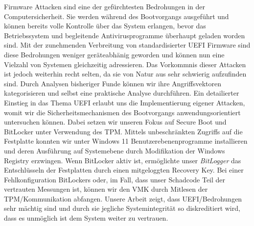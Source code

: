 Firmware Attacken sind eine der gef\"urchtesten Bedrohungen in der Computersicherheit.
Sie werden w\"ahrend des Bootvorgangs ausgef\"uhrt und k\"onnen bereits volle Kontrolle \"uber das System erlangen, bevor das Betriebssystem und begleitende Antivirusprogramme \"uberhaupt geladen worden sind.
Mit der zunehmenden Verbreitung von standardisierter \acf{UEFI} Firmware sind diese Bedrohungen weniger ger\"ateabh\"anig geworden und k\"onnen nun eine Vielzahl von Systemen gleichzeitig adressieren.
Das Vorkommnis dieser Attacken ist jedoch weiterhin recht selten, da sie von Natur aus sehr schwierig aufzufinden sind.
Durch Analysen bisheriger Funde k\"onnen wir ihre Angriffsvektoren kategorisieren und selbst eine praktische Analyse durchf\"uhren.
Ein detailierter Einstieg in das Thema \ac{UEFI} erlaubt uns die Implementierung eigener Attacken, womit wir die Sicherheitsmechanismen des Bootvorgangs anwendungsorientiert untersuchen k\"onnen.
Dabei setzen wir unseren Fokus auf Secure Boot und BitLocker unter Verwendung des \acf{TPM}.
Mittels unbeschr\"ankten Zugriffs auf die Festplatte konnten wir unter Windows 11 Benutzerebenenprogramme installieren und deren Ausf\"uhrung auf Systemebene durch Modifikation der Windows Registry erzwingen.
Wenn BitLocker aktiv ist, erm\"oglichte unser \emph{BitLogger} das Entschl\"usseln der Festplatten durch einen mitgeloggten Recovery Key.
Bei einer Fehlkonfiguration BitLockers oder, im Fall, dass unser Schadcode Teil der vertrauten Messungen ist, k\"onnen wir den \ac{VMK} durch Mitlesen der \ac{TPM}\-/Kommunikation abfangen.
Unsere Arbeit zeigt, dass \ac{UEFI}\-/Bedrohungen sehr m\"achtig sind und durch sie jegliche Systemintegrit\"at so diskreditiert wird, dass es unm\"oglich ist dem System weiter zu vertrauen.

\acresetall